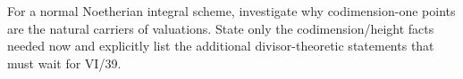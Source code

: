 \begin{problem}\label{chal:vi31-05}
For a normal Noetherian integral scheme, investigate why codimension-one points are the natural carriers of valuations. State only the codimension/height facts needed now and explicitly list the additional divisor-theoretic statements that must wait for VI/39.
\end{problem}
